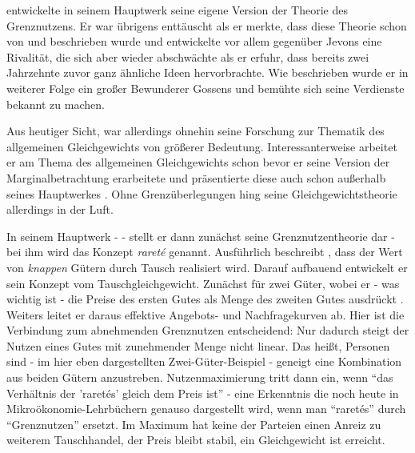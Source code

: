 \textcite{Walras1874} entwickelte in seinem Hauptwerk seine eigene Version der Theorie des Grenznutzens. Er war übrigens enttäuscht als er merkte, dass diese Theorie schon von \textcite{Jevons1871} und \textcite{Menger1871} beschrieben wurde und entwickelte vor allem gegenüber Jevons eine Rivalität, die sich aber wieder abschwächte als er erfuhr, dass \textcite{Gossen1854} bereits zwei Jahrzehnte zuvor ganz ähnliche Ideen hervorbrachte. Wie beschrieben wurde er in weiterer Folge ein großer Bewunderer Gossens und bemühte sich seine Verdienste bekannt zu machen. 

Aus heutiger Sicht, war allerdings ohnehin seine Forschung zur Thematik des allgemeinen Gleichgewichts von größerer Bedeutung. Interessanterweise arbeitet er am Thema des allgemeinen Gleichgewichts schon bevor er seine Version der Marginalbetrachtung erarbeitete und präsentierte diese auch schon außerhalb seines Hauptwerkes \parencite[S. 513ff]{Jaffe1976}. Ohne Grenzüberlegungen hing seine Gleichgewichtstheorie allerdings in der Luft.

In seinem Hauptwerk - \textcite{Walras1874} - stellt er dann zunächst seine Grenznutzentheorie dar - bei ihm wird das Konzept \textit{rareté} genannt. Ausführlich beschreibt \textcite[S. 21ff]{Walras1874}, dass der Wert von \textit{knappen} Gütern durch Tausch realisiert wird. Darauf aufbauend entwickelt er sein Konzept vom Tauschgleichgewicht. Zunächst für zwei Güter, wobei er - was wichtig ist - die Preise des ersten Gutes als Menge des zweiten Gutes ausdrückt \parencite[S. 47]{Walras1874}. Weiters leitet er daraus effektive Angebots- und Nachfragekurven ab. Hier ist die Verbindung zum abnehmenden Grenznutzen entscheidend: Nur dadurch steigt der Nutzen eines Gutes mit zunehmender Menge nicht linear. Das heißt, Personen sind - im hier eben dargestellten Zwei-Güter-Beispiel - geneigt eine Kombination aus beiden Gütern anzustreben. Nutzenmaximierung tritt dann ein, wenn "`das Verhältnis der 'raretés' gleich dem Preis ist"' \parencite[S. 89]{Walras1874} - eine Erkenntnis die noch heute in Mikroökonomie-Lehrbüchern genauso dargestellt wird, wenn man "`raretés"' durch "`Grenznutzen"' ersetzt. Im Maximum hat keine der Parteien einen Anreiz zu weiterem Tauschhandel, der Preis bleibt stabil, ein Gleichgewicht ist erreicht.

